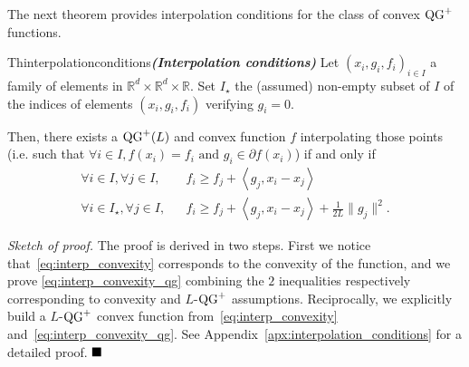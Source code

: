 The next theorem provides interpolation conditions for the class of convex $\operatorname{QG}^+$ functions.

\begin{center}
\begin{restatable}{Th}{interpolationconditions}\textbf{\emph{(Interpolation conditions)}}
    \label{thm:interp}
    Let $(x_i, g_i, f_i)_{i \in I}$ a family of elements in $\mathbb{R}^d \times \mathbb{R}^d \times \mathbb{R}$. Set $I_\star$ the (assumed) non-empty subset of $I$ of the indices of elements $(x_i, g_i, f_i)$ verifying $g_i=0$.
    
    Then, there exists a $\operatorname{QG}^+(L)$ and convex function $f$ interpolating those points (i.e. such that $\forall i \in I, f(x_i) = f_i \text{ and } g_i \in \partial f(x_i)$) if and only if
    \begin{eqnarray}
        \forall i \in I, \forall j \in I, && f_i \geq f_j + \left< g_j, x_i - x_j \right> \label{eq:interp_convexity} \\
        \forall i \in I_\star, \forall j \in I, && f_i \geq f_j + \left< g_j, x_i - x_j \right> + \frac{1}{2L} \|g_j\|^2 .\label{eq:interp_convexity_qg}
    \end{eqnarray}
\end{restatable}
\end{center}

\noindent \textit{Sketch of proof.}
    The proof is derived in two steps.
    First we notice that~\eqref{eq:interp_convexity} corresponds to the convexity of the function, and we prove \eqref{eq:interp_convexity_qg} combining the $2$ inequalities respectively corresponding to convexity and $L$-$\operatorname{QG}^+$ assumptions.
    Reciprocally, we explicitly build a $L$-$\operatorname{QG}^+$ convex function from~\eqref{eq:interp_convexity} and~\eqref{eq:interp_convexity_qg}.
    See Appendix~\ref{apx:interpolation_conditions} for a detailed proof.
$\hfill\blacksquare$

